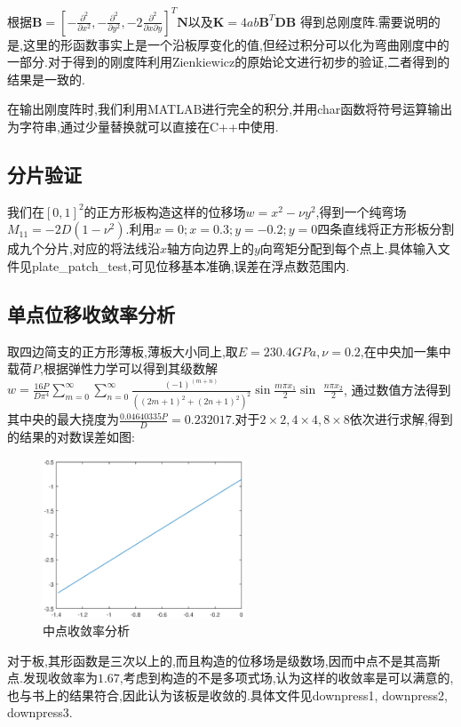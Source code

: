 根据$\mathbf{B}=[-\frac{\partial^2}{\partial x^2},-\frac{\partial^2}{\partial y^2},-2\frac{\partial^2}{\partial x \partial y}]^T\mathbf{N}$以及$\mathbf{K}=4ab\mathbf{B}^T\mathbf{D}\mathbf{B}$ 得到总刚度阵.需要说明的是,这里的形函数事实上是一个沿板厚变化的值,但经过积分可以化为弯曲刚度中的一部分.对于得到的刚度阵利用Zienkiewicz的原始论文进行初步的验证,二者得到的结果是一致的.

在输出刚度阵时,我们利用MATLAB进行完全的积分,并用char函数将符号运算输出为字符串,通过少量替换就可以直接在C++中使用.

\subsection{分片验证}

我们在$[0,1]^2$的正方形板构造这样的位移场$w=x^2-\nu y^2$,得到一个纯弯场$M_{11}=-2D(1-\nu^2)$.利用$x=0;x=0.3;y=-0.2;y=0$四条直线将正方形板分割成九个分片,对应的将法线沿$x$轴方向边界上的$y$向弯矩分配到每个点上.具体输入文件见plate\_patch\_test,可见位移基本准确,误差在浮点数范围内.

\subsection{单点位移收敛率分析}

取四边简支的正方形薄板,薄板大小同上,取$E=230.4GPa,\nu=0.2$,在中央加一集中载荷$P$,根据弹性力学可以得到其级数解$w=\frac{16P}{D\pi^4}\sum\limits_{m=0}^{\infty}\sum\limits_{n=0}^{\infty} \frac{(-1)^(m+n)}{((2m+1)^2+(2n+1)^2)^2}\sin\frac{m\pi x_1}{2}\sin$ $\frac{n\pi x_2}{2}$, 通过数值方法得到其中央的最大挠度为$\frac{0.04640335P}{D}=0.232017$.对于$2\times 2,4\times 4,8\times 8$依次进行求解,得到的结果的对数误差如图:

\begin{figure}[htbp]
  \centering
  \includegraphics[width=6cm]{plateconvergence}
  \caption{中点收敛率分析}
\end{figure}
对于板,其形函数是三次以上的,而且构造的位移场是级数场,因而中点不是其高斯点.发现收敛率为$1.67$,考虑到构造的不是多项式场,认为这样的收敛率是可以满意的,也与书上的结果符合,因此认为该板是收敛的.具体文件见downpress1, downpress2, downpress3.

